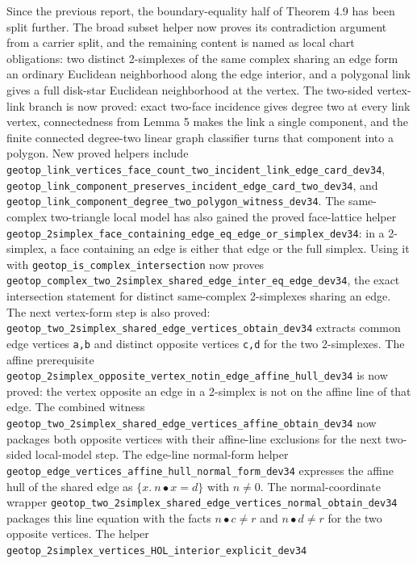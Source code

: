 \documentclass{article}
\begin{document}
Since the previous report, the boundary-equality half of Theorem 4.9 has been
split further. The broad subset helper now proves its contradiction argument
from a carrier split, and the remaining content is named as local chart
obligations: two distinct 2-simplexes of the same complex sharing an edge form
an ordinary Euclidean neighborhood along the edge interior, and a polygonal link
gives a full disk-star Euclidean neighborhood at the vertex. The two-sided
vertex-link branch is now proved: exact two-face incidence gives degree two at
every link vertex, connectedness from Lemma 5 makes the link a single
component, and the finite connected degree-two linear graph classifier turns
that component into a polygon. New proved helpers include
\texttt{geotop\_link\_vertices\_face\_count\_two\_incident\_link\_edge\_card\_dev34},
\texttt{geotop\_link\_component\_preserves\_incident\_edge\_card\_two\_dev34},
and \texttt{geotop\_link\_component\_degree\_two\_polygon\_witness\_dev34}.
The same-complex two-triangle local model has also gained the proved
face-lattice helper
\texttt{geotop\_2simplex\_face\_containing\_edge\_eq\_edge\_or\_simplex\_dev34}:
in a 2-simplex, a face containing an edge is either that edge or the full
simplex. Using it with \texttt{geotop\_is\_complex\_intersection} now proves
\texttt{geotop\_complex\_two\_2simplex\_shared\_edge\_inter\_eq\_edge\_dev34},
the exact intersection statement for distinct same-complex 2-simplexes sharing
an edge. The next vertex-form step is also proved:
\texttt{geotop\_two\_2simplex\_shared\_edge\_vertices\_obtain\_dev34}
extracts common edge vertices \texttt{a,b} and distinct opposite vertices
\texttt{c,d} for the two 2-simplexes. The affine prerequisite
\texttt{geotop\_2simplex\_opposite\_vertex\_notin\_edge\_affine\_hull\_dev34}
is now proved: the vertex opposite an edge in a 2-simplex is not on the affine
line of that edge. The combined witness
\texttt{geotop\_two\_2simplex\_shared\_edge\_vertices\_affine\_obtain\_dev34}
now packages both opposite vertices with their affine-line exclusions for the
next two-sided local-model step. The edge-line normal-form helper
\texttt{geotop\_edge\_vertices\_affine\_hull\_normal\_form\_dev34}
expresses the affine hull of the shared edge as
\(\{x.\ n\bullet x=d\}\) with \(n\neq 0\). The normal-coordinate wrapper
\texttt{geotop\_two\_2simplex\_shared\_edge\_vertices\_normal\_obtain\_dev34}
packages this line equation with the facts \(n\bullet c\neq r\) and
\(n\bullet d\neq r\) for the two opposite vertices. The helper
\texttt{geotop\_2simplex\_vertices\_HOL\_interior\_explicit\_dev34}
\end{document}
